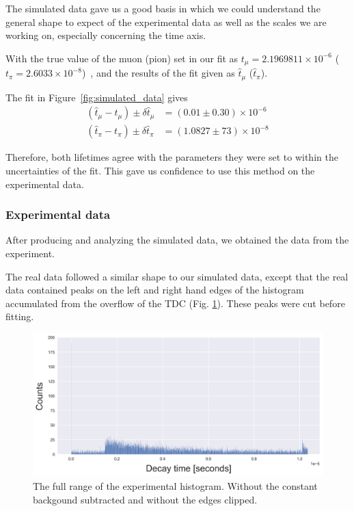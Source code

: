 \documentclass[11pt,a4paper]{article}
\begin{document}
The simulated data gave us a good basis in which we could understand the general shape to expect of the experimental data as well as the scales we are working on, especially concerning the time axis. 

With the true value of the muon (pion) set in our fit as \(t_\mu=2.1969811 \times 10^{-6}\) (\(t_\pi=2.6033 \times 10^{-8}\))~\cite{Literature Values}, and the results of the fit given as \(\hat t_\mu\) (\(\hat t_\pi\)).

The fit in Figure~\ref{fig:simulated_data} gives
\begin{align}
(\hat t_\mu - t_\mu) \pm \delta \hat t_\mu
&= (0.01 \pm 0.30) \times 10^{-6}\\
(\hat t_\pi - t_\pi) \pm \delta \hat t_\pi
&= (1.0827 \pm 73) \times 10^{-8}
\end{align}

Therefore, both lifetimes agree with the parameters they were set to within the uncertainties of the fit. This gave us confidence to use this method on the experimental data.

\subsubsection{Experimental data}
After producing and analyzing the simulated data, we obtained the data from the experiment.

The real data followed a similar shape to our simulated data, except that the real data contained peaks on the left and right hand edges of the histogram accumulated from the overflow of the TDC (Fig. \ref{fig:full_experimental_histogram}). These peaks were cut before fitting.

\begin{figure}
    \centering
    \includegraphics[width=1\linewidth]{full_experimental_histogram.png}
    \caption{The full range of the experimental histogram. Without the constant backgound subtracted and without the edges clipped.}
    \label{fig:full_experimental_histogram}
\end{figure}
\end{document}
